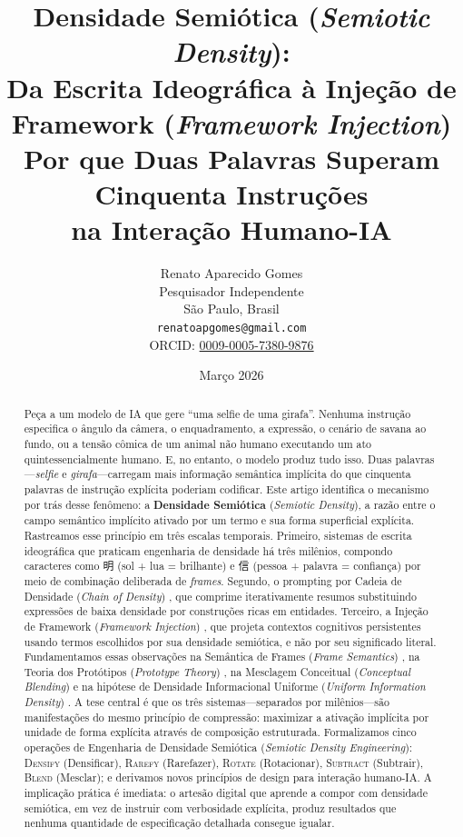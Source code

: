 \documentclass[12pt,a4paper]{article}
\title{%
  \vspace{-1cm}
  \textbf{Densidade Semiótica (\textit{Semiotic Density}):\\
  Da Escrita Ideográfica à Injeção de Framework (\textit{Framework Injection})}\\[0.5em]
  \large Por que Duas Palavras Superam Cinquenta Instruções\\na Interação Humano-IA
}
\author{
  Renato Aparecido Gomes\\
  Pesquisador Independente\\
  S\~{a}o Paulo, Brasil\\
  \texttt{renatoapgomes@gmail.com}\\
  ORCID: \href{https://orcid.org/0009-0005-7380-9876}{0009-0005-7380-9876}
}
\date{Março 2026}
\newcommand{\cjk}[1]{{\cjkfont #1}}
\begin{document}
\maketitle
\thispagestyle{empty}

\begin{abstract}
\noindent
Peça a um modelo de IA que gere ``uma selfie de uma girafa''.
Nenhuma instrução especifica o ângulo da câmera, o enquadramento, a expressão, o cenário de savana ao fundo, ou a tensão cômica de um animal não humano executando um ato quintessencialmente humano.
E, no entanto, o modelo produz tudo isso.
Duas palavras---\textit{selfie} e \textit{girafa}---carregam mais informação semântica implícita do que cinquenta palavras de instrução explícita poderiam codificar.
Este artigo identifica o mecanismo por trás desse fenômeno: a \textbf{Densidade Semiótica} (\textit{Semiotic Density}), a razão entre o campo semântico implícito ativado por um termo e sua forma superficial explícita.
Rastreamos esse princípio em três escalas temporais.
Primeiro, sistemas de escrita ideográfica que praticam engenharia de densidade há três milênios, compondo caracteres como \cjk{明} (sol + lua = brilhante) e \cjk{信} (pessoa + palavra = confiança) por meio de combinação deliberada de \textit{frames}.
Segundo, o prompting por Cadeia de Densidade (\textit{Chain of Density}) \cite{adams2023}, que comprime iterativamente resumos substituindo expressões de baixa densidade por construções ricas em entidades.
Terceiro, a Injeção de Framework (\textit{Framework Injection}) \cite{gomes2026founding}, que projeta contextos cognitivos persistentes usando termos escolhidos por sua densidade semiótica, e não por seu significado literal.
Fundamentamos essas observações na Semântica de Frames (\textit{Frame Semantics}) \cite{fillmore1982}, na Teoria dos Protótipos (\textit{Prototype Theory}) \cite{rosch1975}, na Mesclagem Conceitual (\textit{Conceptual Blending}) \cite{fauconnier2002} e na hipótese de Densidade Informacional Uniforme (\textit{Uniform Information Density}) \cite{frank2008}.
A tese central é que os três sistemas---separados por milênios---são manifestações do mesmo princípio de compressão: maximizar a ativação implícita por unidade de forma explícita através de composição estruturada.
Formalizamos cinco operações de Engenharia de Densidade Semiótica (\textit{Semiotic Density Engineering}): \textsc{Densify} (Densificar), \textsc{Rarefy} (Rarefazer), \textsc{Rotate} (Rotacionar), \textsc{Subtract} (Subtrair), \textsc{Blend} (Mesclar); e derivamos novos princípios de design para interação humano-IA.
A implicação prática é imediata: o artesão digital que aprende a compor com densidade semiótica, em vez de instruir com verbosidade explícita, produz resultados que nenhuma quantidade de especificação detalhada consegue igualar.


\end{abstract}
\end{document}
